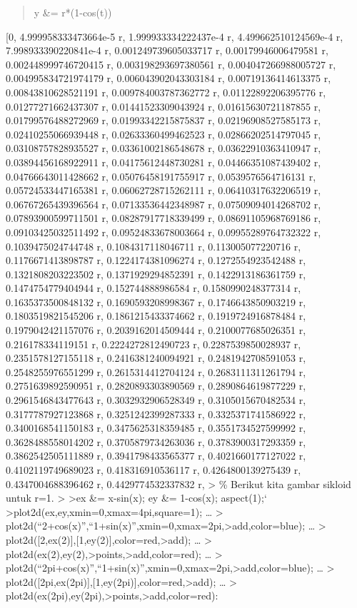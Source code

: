 \documentclass[
]{book}
\begin{document}
\begin{quote}
y \&= r*(1-cos(t))
\end{quote}

{[}0, 4.999958333473664e-5 r, 1.999933334222437e-4 r, 4.499662510124569e-4 r, 7.998933390220841e-4 r, 0.001249739605033717 r, 0.00179946006479581 r, 0.002448999746720415 r, 0.003198293697380561 r, 0.004047266988005727 r, 0.004995834721974179 r, 0.006043902043303184 r, 0.00719136414613375 r, 0.00843810628521191 r, 0.009784003787362772 r, 0.01122892206395776 r, 0.01277271662437307 r, 0.01441523309043924 r, 0.01615630721187855 r, 0.01799576488272969 r, 0.01993342215875837 r, 0.02196908527585173 r, 0.02410255066939448 r, 0.02633360499462523 r, 0.02866202514797045 r, 0.03108757828935527 r, 0.03361002186548678 r, 0.03622910363410947 r, 0.03894456168922911 r, 0.04175612448730281 r, 0.04466351087439402 r, 0.04766643011428662 r, 0.05076458191755917 r, 0.0539576564716131 r, 0.05724533447165381 r, 0.06062728715262111 r, 0.06410317632206519 r, 0.06767265439396564 r, 0.07133536442348987 r, 0.07509094014268702 r, 0.07893900599711501 r, 0.08287917718339499 r, 0.08691105968769186 r, 0.09103425032511492 r, 0.09524833678003664 r, 0.09955289764732322 r, 0.1039475024744748 r, 0.1084317118046711 r, 0.113005077220716 r, 0.1176671413898787 r, 0.1224174381096274 r, 0.1272554923542488 r, 0.1321808203223502 r, 0.1371929294852391 r, 0.1422913186361759 r, 0.1474754779404944 r, 0.152744888986584 r, 0.1580990248377314 r, 0.1635373500848132 r, 0.1690593208998367 r, 0.1746643850903219 r, 0.1803519821545206 r, 0.1861215433374662 r, 0.1919724916878484 r, 0.1979042421157076 r, 0.2039162014509444 r, 0.2100077685026351 r, 0.216178334119151 r, 0.2224272812490723 r, 0.2287539850028937 r, 0.2351578127155118 r, 0.2416381240094921 r, 0.2481942708591053 r, 0.2548255976551299 r, 0.2615314412704124 r, 0.2683111311261794 r, 0.2751639892590951 r, 0.2820893303890569 r, 0.2890864619877229 r, 0.2961546843477643 r, 0.3032932906528349 r, 0.3105015670482534 r, 0.3177787927123868 r, 0.3251242399287333 r, 0.3325371741586922 r, 0.3400168541150183 r, 0.3475625318359485 r, 0.3551734527599992 r, 0.3628488558014202 r, 0.3705879734263036 r, 0.3783900317293359 r, 0.3862542505111889 r, 0.3941798433565377 r, 0.4021660177127022 r, 0.4102119749689023 r, 0.418316910536117 r, 0.4264800139275439 r, 0.4347004688396462 r, 0.4429774532337832 r, \textgreater{} \% Berikut kita gambar sikloid untuk r=1. \textgreater{} \textgreater ex \&= x-sin(x); ey \&= 1-cos(x); aspect(1);` \textgreater plot2d(ex,ey,xmin=0,xmax=4pi,square=1); \ldots{} \textgreater{} plot2d(``2+cos(x)'',``1+sin(x)'',xmin=0,xmax=2pi,\textgreater add,color=blue); \ldots{} \textgreater{} plot2d({[}2,ex(2){]},{[}1,ey(2){]},color=red,\textgreater add); \ldots{} \textgreater{} plot2d(ex(2),ey(2),\textgreater points,\textgreater add,color=red); \ldots{} \textgreater{} plot2d(``2pi+cos(x)'',``1+sin(x)'',xmin=0,xmax=2pi,\textgreater add,color=blue); \ldots{} \textgreater{} plot2d({[}2pi,ex(2pi){]},{[}1,ey(2pi){]},color=red,\textgreater add); \ldots{} \textgreater{} plot2d(ex(2pi),ey(2pi),\textgreater points,\textgreater add,color=red):
\end{document}
